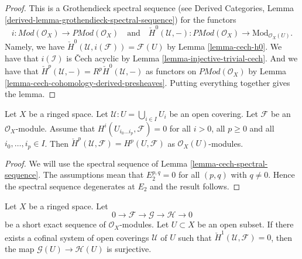 \begin{proof}
This is a Grothendieck spectral sequence
(see
Derived Categories, Lemma \ref{derived-lemma-grothendieck-spectral-sequence})
for the functors
$$
i :  \textit{Mod}(\mathcal{O}_X) \to \textit{PMod}(\mathcal{O}_X)
\quad\text{and}\quad
\check{H}^0(\mathcal{U}, - ) : \textit{PMod}(\mathcal{O}_X)
\to \text{Mod}_{\mathcal{O}_X(U)}.
$$
Namely, we have $\check{H}^0(\mathcal{U}, i(\mathcal{F})) = \mathcal{F}(U)$
by Lemma \ref{lemma-cech-h0}. We have that $i(\mathcal{I})$ is
{\v C}ech acyclic by Lemma \ref{lemma-injective-trivial-cech}. And we
have that $\check{H}^p(\mathcal{U}, -) = R^p\check{H}^0(\mathcal{U}, -)$
as functors on $\textit{PMod}(\mathcal{O}_X)$
by Lemma \ref{lemma-cech-cohomology-derived-presheaves}.
Putting everything together gives the lemma.
\end{proof}

\begin{lemma}
\label{lemma-cech-spectral-sequence-application}
Let $X$ be a ringed space.
Let $\mathcal{U} : U = \bigcup_{i \in I} U_i$ be an open covering.
Let $\mathcal{F}$ be an $\mathcal{O}_X$-module.
Assume that $H^i(U_{i_0 \ldots i_p}, \mathcal{F}) = 0$
for all $i > 0$, all $p \geq 0$ and all $i_0, \ldots, i_p \in I$.
Then $\check{H}^p(\mathcal{U}, \mathcal{F}) = H^p(U, \mathcal{F})$
as $\mathcal{O}_X(U)$-modules.
\end{lemma}

\begin{proof}
We will use the spectral sequence of
Lemma \ref{lemma-cech-spectral-sequence}.
The assumptions mean that $E_2^{p, q} = 0$ for all $(p, q)$ with
$q \not = 0$. Hence the spectral sequence degenerates at $E_2$
and the result follows.
\end{proof}

\begin{lemma}
\label{lemma-ses-cech-h1}
Let $X$ be a ringed space.
Let
$$
0 \to \mathcal{F} \to \mathcal{G} \to \mathcal{H} \to 0
$$
be a short exact sequence of $\mathcal{O}_X$-modules.
Let $U \subset X$ be an open subset.
If there exists a cofinal system of open coverings $\mathcal{U}$
of $U$ such that $\check{H}^1(\mathcal{U}, \mathcal{F}) = 0$,
then the map $\mathcal{G}(U) \to \mathcal{H}(U)$ is
surjective.
\end{lemma}

